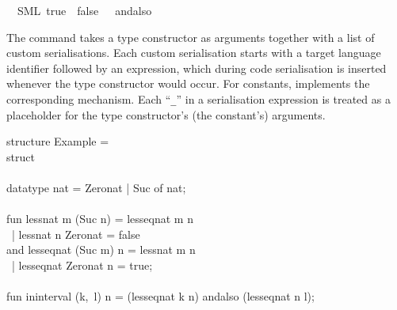 \begin{isabellebody}
\ \ {\isacharparenleft}SML\ {\isachardoublequoteopen}true{\isachardoublequoteclose}\ \ {\isachardoublequoteopen}false{\isachardoublequoteclose}\ \ {\isachardoublequoteopen}{\isacharunderscore}\ andalso\ {\isacharunderscore}{\isachardoublequoteclose}{\isacharparenright}%
\endisatagquotett
{\isafoldquotett}%
%
\isadelimquotett
%
\endisadelimquotett
%
\begin{isamarkuptext}%
\noindent The \hyperlink{command.code-type}{\mbox{}} command takes a type constructor
  as arguments together with a list of custom serialisations.
  Each custom serialisation starts with a target language
  identifier followed by an expression, which during
  code serialisation is inserted whenever the type constructor
  would occur.  For constants, \hyperlink{command.code-const}{\mbox{}} implements
  the corresponding mechanism.  Each ``\verb|_|'' in
  a serialisation expression is treated as a placeholder
  for the type constructor's (the constant's) arguments.%
\end{isamarkuptext}%
\isamarkuptrue%
%
\isadelimquote
%
\endisadelimquote
%
\isatagquote
%
\begin{isamarkuptext}%
\isatypewriter%
\noindent%
\hspace*{0pt}structure Example = \\
\hspace*{0pt}struct\\
\hspace*{0pt}\\
\hspace*{0pt}datatype nat = Zero{}nat | Suc of nat;\\
\hspace*{0pt}\\
\hspace*{0pt}fun less{}nat m (Suc n) = less{}eq{}nat m n\\
\hspace*{0pt} ~| less{}nat n Zero{}nat = false\\
\hspace*{0pt}and less{}eq{}nat (Suc m) n = less{}nat m n\\
\hspace*{0pt} ~| less{}eq{}nat Zero{}nat n = true;\\
\hspace*{0pt}\\
\hspace*{0pt}fun in{}interval (k,~l) n = (less{}eq{}nat k n) andalso (less{}eq{}nat n l);\\

\end{isamarkuptext}
\end{isabellebody}
